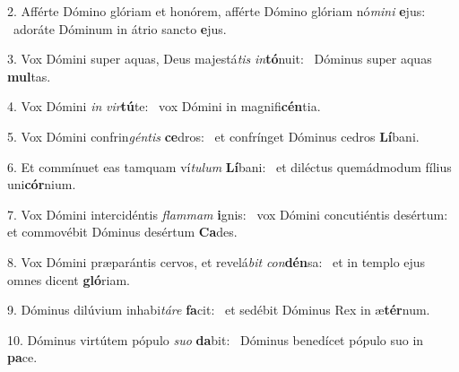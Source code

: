 2. Afférte Dómino glóriam et honórem, afférte Dómino glóriam nó\textit{mi}\textit{ni} \textbf{e}jus: \ast\  adoráte Dóminum in átrio sancto \textbf{e}jus.\

3. Vox Dómini super aquas, Deus majestá\textit{tis} \textit{in}\textbf{tó}nuit: \ast\  Dóminus super aquas \textbf{mul}tas.\

4. Vox Dómini \textit{in} \textit{vir}\textbf{tú}te: \ast\  vox Dómini in magnifi\textbf{cén}tia.\

5. Vox Dómini confrin\textit{gén}\textit{tis} \textbf{ce}dros: \ast\  et confrínget Dóminus cedros \textbf{Lí}bani.\

6. Et commínuet eas tamquam ví\textit{tu}\textit{lum} \textbf{Lí}bani: \ast\  et diléctus quemádmodum fílius uni\textbf{cór}nium.\

7. Vox Dómini intercidéntis \textit{flam}\textit{mam} \textbf{i}gnis: \ast\  vox Dómini concutiéntis desértum: et commovébit Dóminus desértum \textbf{Ca}des.\

8. Vox Dómini præparántis cervos, et revelá\textit{bit} \textit{con}\textbf{dén}sa: \ast\  et in templo ejus omnes dicent \textbf{gló}riam.\

9. Dóminus dilúvium inhabi\textit{tá}\textit{re} \textbf{fa}cit: \ast\  et sedébit Dóminus Rex in æ\textbf{tér}num.\

10. Dóminus virtútem pópulo \textit{su}\textit{o} \textbf{da}bit: \ast\  Dóminus benedícet pópulo suo in \textbf{pa}ce.\

